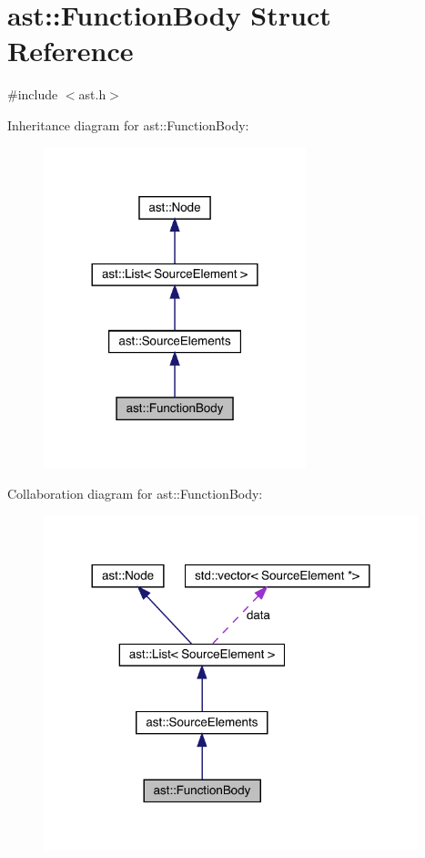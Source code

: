 \hypertarget{structast_1_1_function_body}{}\section{ast\+:\+:Function\+Body Struct Reference}
\label{structast_1_1_function_body}


{\ttfamily \#include $<$ast.\+h$>$}



Inheritance diagram for ast\+:\+:Function\+Body\+:\nopagebreak
\begin{figure}[H]
\begin{center}
\leavevmode
\includegraphics[width=216pt]{structast_1_1_function_body__inherit__graph}
\end{center}
\end{figure}


Collaboration diagram for ast\+:\+:Function\+Body\+:\nopagebreak
\begin{figure}[H]
\begin{center}
\leavevmode
\includegraphics[width=308pt]{structast_1_1_function_body__coll__graph}
\end{center}
\end{figure}
